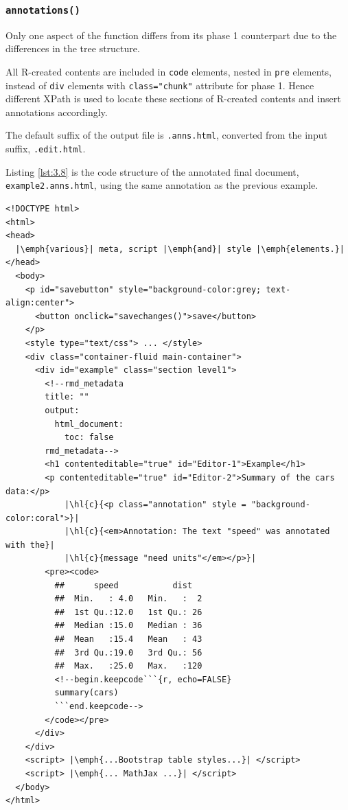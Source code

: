 \documentclass[a4paper, 12pt]{report}
\begin{document}
\subsubsection*{\texttt{annotations()}}
Only one aspect of the function differs from its phase 1 counterpart due to the differences in the tree structure.

All R-created contents are included in \texttt{code} elements, nested in \texttt{pre} elements, instead of \texttt{div} elements with \texttt{class="chunk"} attribute for phase 1. Hence different XPath is used to locate these sections of R-created contents and insert annotations accordingly.

The default suffix of the output file is \texttt{.anns.html}, converted from the input suffix, \texttt{.edit.html}.

Listing \ref{lst:3.8} is the code structure of the annotated final document, \texttt{example2.anns.html}, using the same annotation as the previous example.
\begin{lstlisting}[caption={(tidied) \texttt{example2.anns.html}}, escapechar=\|, label={lst:3.8}]
<!DOCTYPE html>
<html>
<head>
  |\emph{various}| meta, script |\emph{and}| style |\emph{elements.}|
</head>
  <body>
    <p id="savebutton" style="background-color:grey; text-align:center">
      <button onclick="savechanges()">save</button>
    </p>
    <style type="text/css"> ... </style>
    <div class="container-fluid main-container">
      <div id="example" class="section level1">
        <!--rmd_metadata
        title: ""
        output:
          html_document:
            toc: false
        rmd_metadata-->
        <h1 contenteditable="true" id="Editor-1">Example</h1>
        <p contenteditable="true" id="Editor-2">Summary of the cars data:</p>
            |\hl{c}{<p class="annotation" style = "background-color:coral">}|
            |\hl{c}{<em>Annotation: The text "speed" was annotated with the}|
            |\hl{c}{message "need units"</em></p>}|
        <pre><code>
          ##      speed           dist    
    	  ##  Min.   : 4.0   Min.   :  2  
    	  ##  1st Qu.:12.0   1st Qu.: 26  
    	  ##  Median :15.0   Median : 36  
    	  ##  Mean   :15.4   Mean   : 43  
    	  ##  3rd Qu.:19.0   3rd Qu.: 56  
    	  ##  Max.   :25.0   Max.   :120
    	  <!--begin.keepcode```{r, echo=FALSE}
    	  summary(cars)
    	  ```end.keepcode-->
    	</code></pre>
      </div>
    </div>
    <script> |\emph{...Bootstrap table styles...}| </script>
    <script> |\emph{... MathJax ...}| </script>    
  </body>
</html>
\end{lstlisting}
\end{document}
